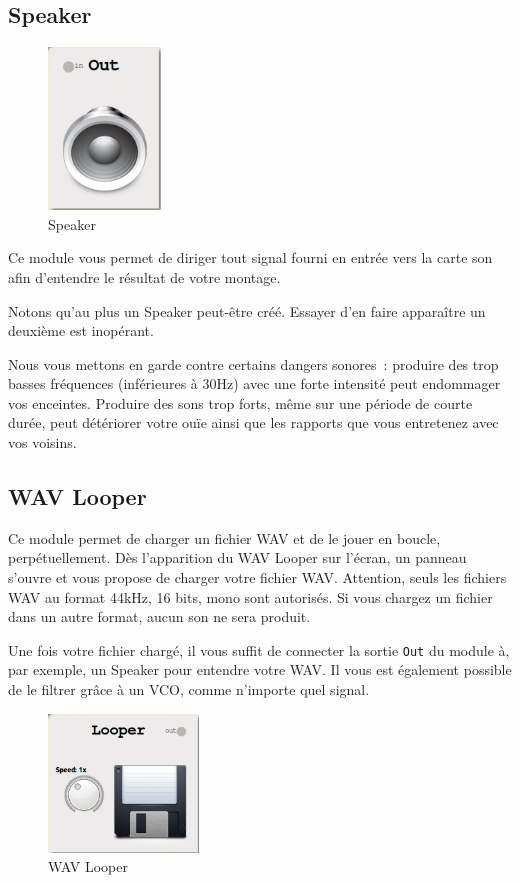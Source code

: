 \documentclass[a4paper,oneside,frenchb,10pt]{article}
\begin{document}
\subsection{Speaker}

\begin{multicols}{2}
\begin{figure}[H]
\centering
\includegraphics[width=3cm]{../img/png/speaker.png}
\caption{Speaker}
\end{figure}

Ce module vous permet de diriger tout signal fourni en entrée vers la
carte son afin d'entendre le résultat de votre montage.

Notons qu'au plus un Speaker peut-être créé. Essayer d'en faire
apparaître un deuxième est inopérant.

Nous vous mettons en garde contre certains dangers sonores~: produire
des trop basses fréquences (inférieures à 30Hz) avec une forte intensité
peut endommager vos enceintes. Produire des sons trop forts, même sur
une période de courte durée, peut détériorer votre ouïe ainsi que les
rapports que vous entretenez avec vos voisins.
\end{multicols}

\subsection{WAV Looper}

\begin{multicols}{2}
Ce module permet de charger un fichier WAV et de le jouer en boucle,
perpétuellement. Dès l'apparition du WAV Looper sur l'écran, un panneau
s'ouvre et vous propose de charger votre fichier WAV. Attention, seuls
les fichiers WAV au format 44kHz, 16 bits, mono sont autorisés. Si vous
chargez un fichier dans un autre format, aucun son ne sera produit.

Une fois votre fichier chargé, il vous suffit de connecter la sortie
\verb!Out! du module à, par exemple, un Speaker pour entendre votre WAV.
Il vous est également possible de le filtrer grâce à un VCO, comme
n'importe quel signal.

\begin{figure}[H]
\centering
\includegraphics[width=4cm]{../img/png/wavlooper.png}
\caption{WAV Looper}
\end{figure}
\end{multicols}
\end{document}
